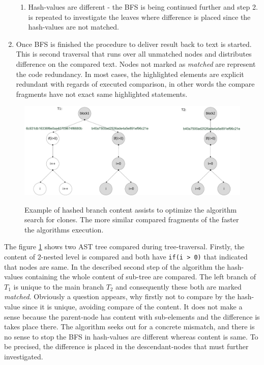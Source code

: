 \documentclass{report}
\begin{document}
\begin{enumerate}
\begin{enumerate}[label*=\arabic*.]
  			\item Hash-values are different - the BFS is being continued further and step 2. is repeated to investigate the leaves where difference is placed since the hash-values are not matched.
	  \end{enumerate}
  \item Once BFS is finished the procedure to deliver result back to text is started. This is second traversal that runs over all unmatched nodes and distributes difference on the compared text. Nodes not marked as \emph{matched} are represent the code redundancy. In most cases, the highlighted elements are explicit redundant with regards of executed comparison, in other words the compare fragments have not exact same highlighted statements.
\end{enumerate}
\begin{figure}[th]
  \centering
  \includegraphics[scale = 0.5]{Figures/text-to-text/example-of-text-opt.pdf}\\[0.1cm]
  \caption[Example of hashed branch]{Example of hashed branch content assists to optimize the algorithm search for clones. The more similar compared fragments of the faster the algorithms execution.}
  \label{fig:example-of-text-opt}
\end{figure}

The figure \ref{fig:example-of-text-opt} shows two AST tree compared during tree-traversal. Firstly, the content of $2$-nested level is compared and both have
\texttt{if(i > 0)} that indicated that nodes are same. In the described second step of the algorithm the hash-values containing the whole content of sub-tree are compared. The left branch of $T_{1}$ is unique to the main branch $T_{2}$ and consequently these both are marked \emph{matched}. Obviously a question appears, why firstly not to compare by the hash-value since it is unique, avoiding compare of the content. It does not make a sense because the parent-node has content with sub-elements and the difference is takes place there. The algorithm seeks out for a concrete mismatch, and there is no sense to stop the BFS in hash-values are different whereas content is same. To be precised, the difference is placed in the descendant-nodes that must further investigated.
\end{document}
